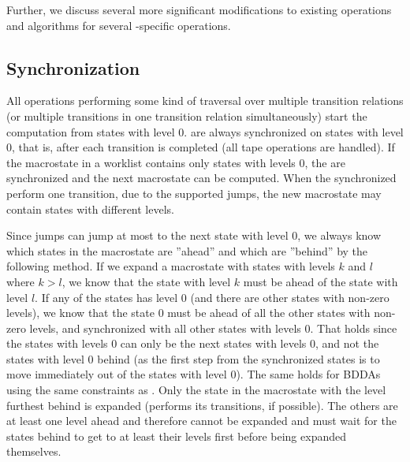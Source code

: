 Further, we discuss several more significant modifications to existing operations and algorithms for several \nft-specific operations.

\subsection{Synchronization}

All operations performing some kind of traversal over multiple transition relations (or multiple transitions in one transition relation simultaneously) start the computation from states with level $0$.
\nfts are always synchronized on states with level $0$, that is, after each \nft transition is completed (all tape operations are handled).
If the macrostate in a worklist contains only states with levels $0$, the \nfts are synchronized and the next macrostate can be computed.
When the synchronized \nfts perform one transition, due to the supported jumps, the new macrostate may contain states with different levels.

Since jumps can jump at most to the next state with level $0$, we always know which states in the macrostate are ''ahead'' and which are ''behind'' by the following method.
If we expand a macrostate with states with levels $k$ and $l$ where $k > l$, we know that the state with level $k$ must be ahead of the state with level $l$.
If any of the states has level $0$ (and there are other states with non-zero levels), we know that the state $0$ must be ahead of all the other states with non-zero levels, and synchronized with all other states with levels $0$.
That holds since the states with levels $0$ can only be the next states with levels $0$, and not the states with level $0$ behind (as the first step from the synchronized states is to move immediately out of the states with level $0$).
The same holds for BDDAs using the same constraints as \nfts.
Only the state in the macrostate with the level furthest behind is expanded (performs its transitions, if possible).
The others are at least one level ahead and therefore cannot be expanded and must wait for the states behind to get to at least their levels first before being expanded themselves.

